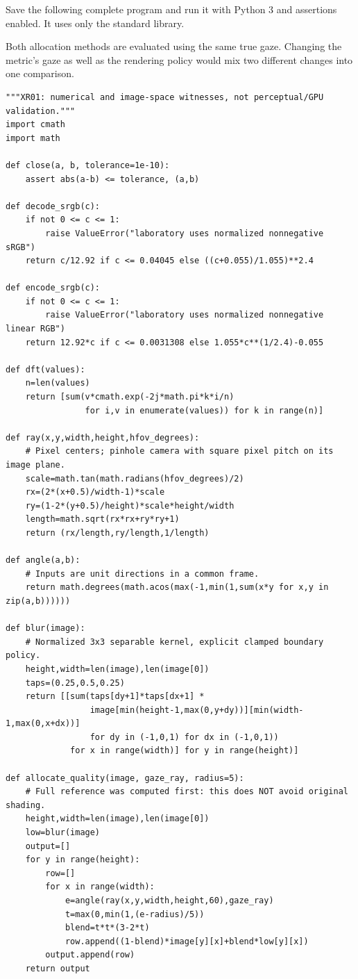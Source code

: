 \hypertarget{04-visual-computing-ii-ch043-complete-numerical-and-image-space-laboratory}{}

Save the following complete program and run it with Python 3 and assertions enabled. It uses only the standard library.

Both allocation methods are evaluated using the same true gaze. Changing the metric's gaze as well as the rendering policy would mix two different changes into one comparison.

\begin{verbatim}
"""XR01: numerical and image-space witnesses, not perceptual/GPU validation."""
import cmath
import math

def close(a, b, tolerance=1e-10):
    assert abs(a-b) <= tolerance, (a,b)

def decode_srgb(c):
    if not 0 <= c <= 1:
        raise ValueError("laboratory uses normalized nonnegative sRGB")
    return c/12.92 if c <= 0.04045 else ((c+0.055)/1.055)**2.4

def encode_srgb(c):
    if not 0 <= c <= 1:
        raise ValueError("laboratory uses normalized nonnegative linear RGB")
    return 12.92*c if c <= 0.0031308 else 1.055*c**(1/2.4)-0.055

def dft(values):
    n=len(values)
    return [sum(v*cmath.exp(-2j*math.pi*k*i/n)
                for i,v in enumerate(values)) for k in range(n)]

def ray(x,y,width,height,hfov_degrees):
    # Pixel centers; pinhole camera with square pixel pitch on its image plane.
    scale=math.tan(math.radians(hfov_degrees)/2)
    rx=(2*(x+0.5)/width-1)*scale
    ry=(1-2*(y+0.5)/height)*scale*height/width
    length=math.sqrt(rx*rx+ry*ry+1)
    return (rx/length,ry/length,1/length)

def angle(a,b):
    # Inputs are unit directions in a common frame.
    return math.degrees(math.acos(max(-1,min(1,sum(x*y for x,y in zip(a,b))))))

def blur(image):
    # Normalized 3x3 separable kernel, explicit clamped boundary policy.
    height,width=len(image),len(image[0])
    taps=(0.25,0.5,0.25)
    return [[sum(taps[dy+1]*taps[dx+1] *
                 image[min(height-1,max(0,y+dy))][min(width-1,max(0,x+dx))]
                 for dy in (-1,0,1) for dx in (-1,0,1))
             for x in range(width)] for y in range(height)]

def allocate_quality(image, gaze_ray, radius=5):
    # Full reference was computed first: this does NOT avoid original shading.
    height,width=len(image),len(image[0])
    low=blur(image)
    output=[]
    for y in range(height):
        row=[]
        for x in range(width):
            e=angle(ray(x,y,width,height,60),gaze_ray)
            t=max(0,min(1,(e-radius)/5))
            blend=t*t*(3-2*t)
            row.append((1-blend)*image[y][x]+blend*low[y][x])
        output.append(row)
    return output


\end{verbatim}
